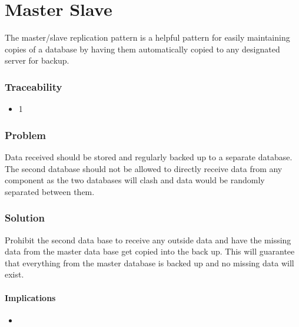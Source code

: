 
\section{Master Slave}

	The master/slave replication pattern is a helpful pattern for easily maintaining copies of a database by having them automatically copied to any designated server for backup.  

	\subsubsection{Traceability} 
		\begin{itemize}
			\item 1
		\end{itemize}


	\subsubsection{Problem}

		Data received should be stored and regularly backed up to a separate database. The second database should not be allowed to directly receive data from any component as the two databases will clash and data would be randomly separated between them.

	\subsubsection{Solution} 

		Prohibit the second data base to receive any outside data and have the missing data from the master data base get copied into the back up. This will guarantee that everything from the master database is backed up and no missing data will exist.


\paragraph{Implications}
\begin{itemize}
	\item
\end{itemize}
